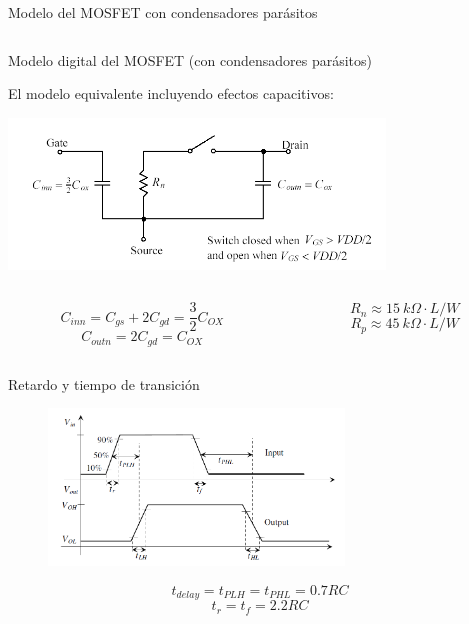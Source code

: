 \documentclass[t,aspectratio=169]{beamer}
\begin{document}
\begin{frame}{Modelo del MOSFET con condensadores parásitos}
\begin{columns}
\begin{column}{0.5\textwidth}
\end{column}

\end{columns}

\end{frame}


\begin{frame}{Modelo digital del MOSFET (con condensadores parásitos)}

El modelo equivalente incluyendo efectos capacitivos:

\centering
\includegraphics[width=10cm]{./figuras/digital6.png}

\begin{columns}

\begin{column}{0.5\textwidth}

\[ C_{inn} = C_{gs} + 2C_{gd} = \dfrac{3}{2} C_{OX} \]
%
\[ C_{outn} = 2C_{gd} = C_{OX} \]

\end{column}

\begin{column}{0.5\textwidth}

\[ R_{n} \approx 15\ k\Omega \cdot L/W \]
\[ R_{p} \approx 45\ k\Omega \cdot L/W \]

\end{column}

\end{columns}

\end{frame}


\begin{frame}{Retardo y tiempo de transición}

\begin{figure}[H]
    \centering
    \includegraphics[width=0.7\textwidth]{figuras/mos_pass_gate_delay_and_transition.png}
\end{figure}

\vspace{-5mm}
\[ t_{delay} = t_{PLH} = t_{PHL} = 0.7 RC \]
\[ t_{r} = t_{f} = 2.2 RC \]

\end{frame}
\end{document}
